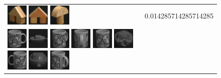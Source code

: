 \begin{figure}[tbp]
\begin{center}
\begin{tabular}{m{11cm} | m{3cm} |}
\includegraphics[width=1cm]{coil/beeld-46.eps}
\includegraphics[width=1cm]{coil/beeld-43.eps}
\includegraphics[width=1cm]{coil/beeld-3.eps}
& {\scriptsize 0.014285714285714285}
\\
\includegraphics[width=1cm]{coil/beeld-48.eps}
\includegraphics[width=1cm]{coil/beeld-27.eps}
\includegraphics[width=1cm]{coil/beeld-53.eps}
\includegraphics[width=1cm]{coil/beeld-50.eps}
\includegraphics[width=1cm]{coil/beeld-52.eps}
\includegraphics[width=1cm]{coil/beeld-26.eps}
\includegraphics[width=1cm]{coil/beeld-51.eps}
\includegraphics[width=1cm]{coil/beeld-28.eps}
\includegraphics[width=1cm]{coil/beeld-49.eps}

\end{tabular}
\end{center}
\end{figure}
